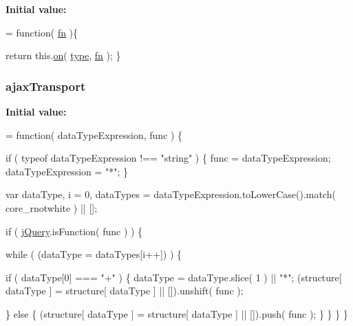 {\bfseries Initial value\-:}
\begin{DoxyCode}
= \textcolor{keyword}{function}( \hyperlink{jquery-1_810_82-vsdoc_8js_acef6bdaf6b9b20fdcca1ea86f0902c3b}{fn} )\{


        \textcolor{keywordflow}{return} this.\hyperlink{jquery-1_810_82-vsdoc_8js_ae453b412b883f60220d73468ef6c6dbc}{on}( \hyperlink{jquery-1_810_82-vsdoc_8js_a3940565e83a9bfd10d95ffd27536da91}{type}, \hyperlink{jquery-1_810_82-vsdoc_8js_acef6bdaf6b9b20fdcca1ea86f0902c3b}{fn} );
    \}
\end{DoxyCode}
\hypertarget{jquery-1_810_82-vsdoc_8js_afe3900e3907689b52735b9c2bf0b8ff6}{
\subsubsection[{ajax\-Transport}]{ ajax\-Transport}}\label{jquery-1_810_82-vsdoc_8js_afe3900e3907689b52735b9c2bf0b8ff6}
{\bfseries Initial value\-:}
\begin{DoxyCode}
= \textcolor{keyword}{function}( dataTypeExpression, func ) \{


        \textcolor{keywordflow}{if} ( typeof dataTypeExpression !== \textcolor{stringliteral}{"string"} ) \{
            func = dataTypeExpression;
            dataTypeExpression = \textcolor{stringliteral}{"*"};
        \}

        var dataType,
            i = 0,
            dataTypes = dataTypeExpression.toLowerCase().match( core\_rnotwhite ) || [];

        \textcolor{keywordflow}{if} ( \hyperlink{jquery-1_810_82-vsdoc_8js_add5237586d970a38a81f990e8eb28c6c}{jQuery}.isFunction( func ) ) \{
            
            \textcolor{keywordflow}{while} ( (dataType = dataTypes[i++]) ) \{
                
                \textcolor{keywordflow}{if} ( dataType[0] === \textcolor{stringliteral}{"+"} ) \{
                    dataType = dataType.slice( 1 ) || \textcolor{stringliteral}{"*"};
                    (structure[ dataType ] = structure[ dataType ] || []).unshift( func );

                
                \} \textcolor{keywordflow}{else} \{
                    (structure[ dataType ] = structure[ dataType ] || []).push( func );
                \}
            \}
        \}
    \}
\end{DoxyCode}
